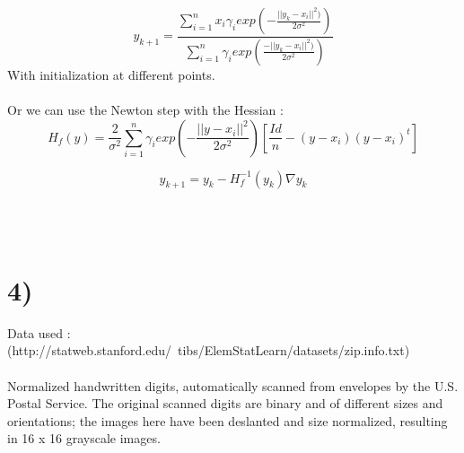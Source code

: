 $$y_{k+1}=\frac{\sum_{i=1}^{n}x_{i}\gamma_{i}exp(-\frac{||y_{k}-x_{i}||^{2})}{2\sigma^{2}})}{\sum_{i=1}^{n}\gamma_{i}exp(\frac{-||y_{k}-x_{i}||^{2})}{2\sigma^{2}})}$$
With initialization at different points.~\\
~\\
Or we can use the Newton step with the Hessian :
$$H_{f}(y)=\frac{2}{\sigma^{2}} \sum_{i=1}^{n}\gamma_{i}exp(-\frac{||y-x_{i}||^{2}}{2\sigma^{2}})[\frac{Id}{n}-(y-x_{i})(y-x_{i})^{t} ]$$

$$y_{k+1}=y_{k}-H_{f}^{-1}(y_{k})\nabla y_{k}$$

~\\
~\\
\section*{4)} Data used : (http://statweb.stanford.edu/~tibs/ElemStatLearn/datasets/zip.info.txt)
~\\
~\\
Normalized handwritten digits, automatically scanned from envelopes by the U.S. Postal Service. The original
scanned digits are binary and of different sizes and orientations; the
images  here have been deslanted and size normalized, resulting
in 16 x 16 grayscale images.


